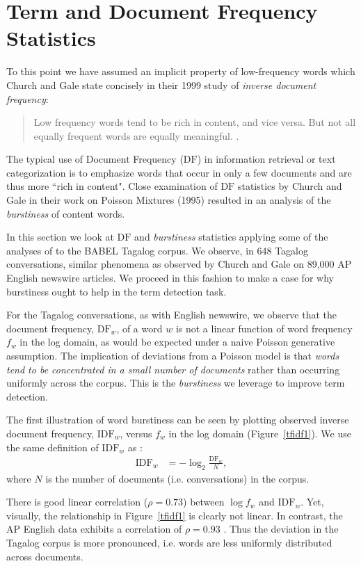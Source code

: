 \documentclass[11pt]{article}
\begin{document}
\section{Term and Document Frequency Statistics}
To this point we have assumed an implicit property of low-frequency words which Church and Gale state concisely in their 1999 study of {\em inverse document frequency}: 
\begin{quote}
Low frequency words tend to be rich in content, and vice versa.  But not all equally frequent words are equally meaningful. .
\end{quote}
The typical use of Document Frequency ($\mathrm{DF}$) in information retrieval or text categorization is to emphasize words that occur in only a few documents and are thus more ``rich in content".  Close examination of $\mathrm{DF}$ statistics by Church and Gale in their work on Poisson Mixtures (1995) resulted in an analysis of the {\em burstiness} of content words.  

In this section we look at $\mathrm{DF}$ and \textit{burstiness} statistics applying some of the analyses of  to the {\small BABEL} Tagalog corpus.  We observe, in 648 Tagalog conversations, similar phenomena as observed by Church and Gale on 89,000 AP English newswire articles.   We proceed in this fashion to make a case for why burstiness ought to help in the term detection task.  


For the Tagalog conversations, as with English newswire, we observe that the document frequency, $\mathrm{DF}_w$, of a word $w$ is not a linear function of word frequency $f_w$ in the log domain, as would be expected under a naive Poisson generative assumption.  The implication of deviations from a Poisson model is that \textit{words tend to be concentrated in a small number of documents} rather than occurring uniformly across the corpus.   This is the {\em burstiness} we leverage to improve term detection.

The first illustration of word burstiness can be seen by plotting observed inverse document frequency, $\mathrm{IDF}_w$, versus $f_w$ in the log domain (Figure~\ref{tfidf1}).  We use the same definition of $\mathrm{IDF}_w$ as : 
\begin{align}
\mathrm{IDF}_w &= -\log_2\frac{\mathrm{DF}_w}{N},
\end{align}
where $N$ is the number of documents (i.e. conversations) in the corpus.  


There is good linear correlation ($\rho=0.73$) between $\log{f_w}$ and $\mathrm{IDF}_w$.  Yet, visually, the relationship in Figure~\ref{tfidf1} is clearly not linear.  In contrast, the AP English data exhibits a correlation of $\rho=0.93$ \cite{church1999}.  Thus the deviation in the Tagalog corpus is more pronounced, i.e. words are less uniformly distributed across documents.    %
\end{document}
